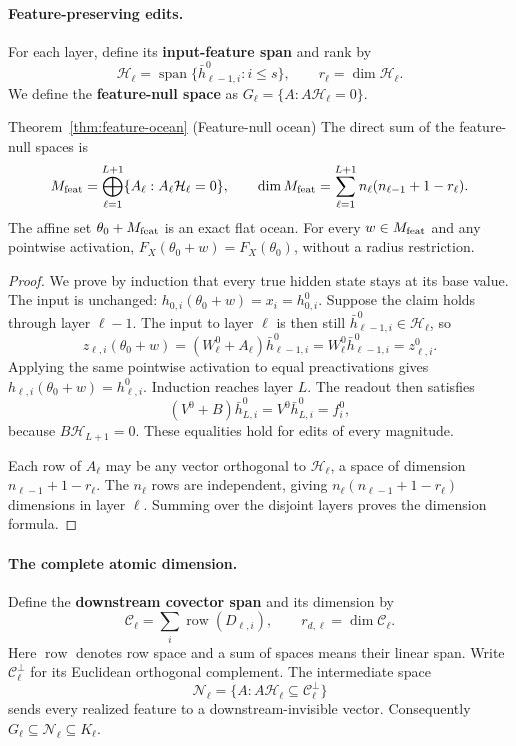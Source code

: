 \documentclass[twoside]{article}
\theoremstyle{remark}
\DeclareMathOperator{\spanop}{span}
\newcommand{\cC}{\mathcal C}
\newcommand{\cH}{\mathcal H}
\theoremstyle{highlightdefinition}
\theoremstyle{remark}
\newcommand{\spn}{\spanop}
\begin{document}
\paragraph{Feature-preserving edits.}
For each layer, define its \textbf{input-feature span} and rank by
\[
 \cH_\ell=\spn\{\bar h_{\ell-1,i}^0:i\le s\},\qquad
 r_\ell=\dim\cH_\ell.
\]
We define the \textbf{feature-null space} as $G_\ell=\{A:A\cH_\ell=0\}$. 
\begin{restated}{Theorem~\ref{thm:feature-ocean} (Feature-null ocean)}
The direct sum of the feature-null spaces is
\[
 M_{\rm feat}=\bigoplus_{\ell=1}^{L+1}\{A_\ell:A_\ell\cH_\ell=0\},
 \qquad
 \dim M_{\rm feat}=\sum_{\ell=1}^{L+1}n_\ell(n_{\ell-1}+1-r_\ell).
\]
The affine set $\theta_0+M_{\rm feat}$ is an exact flat ocean. For every $w\in M_{\rm feat}$ and any pointwise activation,
$F_X(\theta_0+w)=F_X(\theta_0)$, without a radius restriction.
\end{restated}
\begin{proof}
We prove by induction that every true hidden state stays at its base value. The input is unchanged: $h_{0,i}(\theta_0+w)=x_i=h_{0,i}^0$. Suppose the claim holds through layer $\ell-1$. The input to layer $\ell$ is then still $\bar h_{\ell-1,i}^0\in\cH_\ell$, so
\[
 z_{\ell,i}(\theta_0+w)
 =(W_\ell^0+A_\ell)\bar h_{\ell-1,i}^0
 =W_\ell^0\bar h_{\ell-1,i}^0
 =z_{\ell,i}^0.
\]
Applying the same pointwise activation to equal preactivations gives $h_{\ell,i}(\theta_0+w)=h_{\ell,i}^0$. Induction reaches layer $L$. The readout then satisfies
\[
 (V^0+B)\bar h_{L,i}^0=V^0\bar h_{L,i}^0=f_i^0,
\]
because $B\cH_{L+1}=0$. These equalities hold for edits of every magnitude.

Each row of $A_\ell$ may be any vector orthogonal to $\cH_\ell$, a space of dimension $n_{\ell-1}+1-r_\ell$. The $n_\ell$ rows are independent, giving $n_\ell(n_{\ell-1}+1-r_\ell)$ dimensions in layer $\ell$. Summing over the disjoint layers proves the dimension formula.
\end{proof}

\paragraph{The complete atomic dimension.}
Define the \textbf{downstream covector span} and its dimension by
\[
 \cC_\ell=\sum_i\operatorname{row}(D_{\ell,i}),\qquad
 r_{d,\ell}=\dim\cC_\ell.
\]
Here $\operatorname{row}$ denotes row space and a sum of spaces means their linear span. Write $\cC_\ell^\perp$ for its Euclidean orthogonal complement. The intermediate space
\[
 \mathcal N_\ell=\{A:A\cH_\ell\subseteq\cC_\ell^\perp\}
\]
sends every realized feature to a downstream-invisible vector. Consequently $G_\ell\subseteq\mathcal N_\ell\subseteq K_\ell$.
\end{document}
